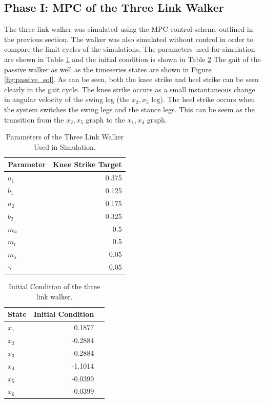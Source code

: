 \documentclass{./springer/svjour3}
\begin{document}
\subsection{Phase I: MPC of the Three Link Walker}

The three link walker was simulated using the MPC control scheme outlined in the previous section. The 
walker was also simulated without control in order to compare the limit cycles of the simulations. The parameters used for simulation are shown in Table
\ref{tab:walker_params} and the initial condition is shown in Table \ref{tab:walker_init}
The gait of the passive walker as well as 
the timeseries states are shown in Figure \ref{fig:passive_sol}. As can be seen, both the knee strike and heel strike can be seen clearly in the gait cycle.
The knee strike occurs as a small instantaneous change in angular velocity of the swing leg (the $x_2, x_5$ leg). The heel strike occurs when the system switches the swing legs 
and the stance legs. This can be seem as the transition from the $x_2, x_5$ graph to the $x_1, x_4$ graph.

\begin{table}[h]
  \centering
  \caption{Parameters of the Three Link Walker Used in Simulation.}
  \begin{tabular}{lr}
  \toprule
  Parameter & Knee Strike Target\\
  \midrule
  $a_1$ & 0.375\\
  $b_1$ & 0.125\\
  $a_2$ & 0.175\\
  $b_2$ & 0.325\\
  $m_h$ & 0.5\\
  $m_t$ & 0.5\\
  $m_s$ & 0.05\\
  $\gamma$ & 0.05\\
  \end{tabular}
  \label{tab:walker_params}
\end{table}

\begin{table}[h]
  \centering
  \caption{Initial Condition of the three link walker.}
  \begin{tabular}{lrr}
  \toprule
  State & Initial Condition\\
  \midrule
  $x_{1}$ & 0.1877 \\
  $x_{2}$ & -0.2884\\
  $x_{3}$ & -0.2884\\
  $x_{4}$ & -1.1014\\
  $x_{5}$ & -0.0399\\
  $x_{6}$ & -0.0399\\
  \end{tabular}
  \label{tab:walker_init}
\end{table}
\end{document}
